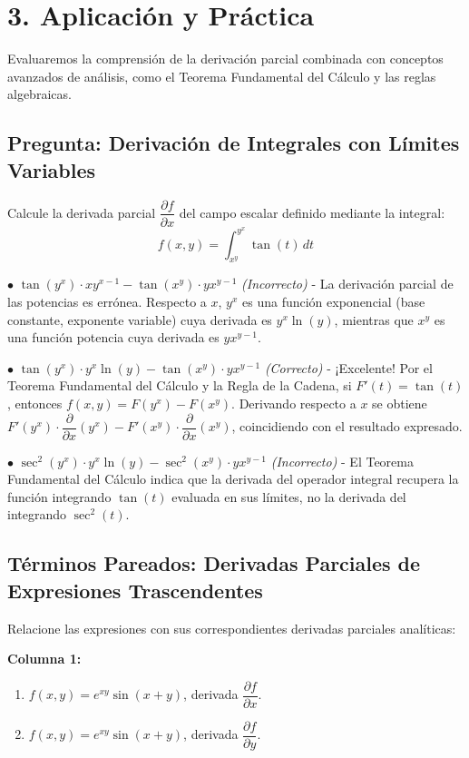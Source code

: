 \documentclass[11pt]{article}
\newenvironment{aplicacion}{%
  \section*{3. Aplicación y Práctica}%
}{}
\newenvironment{preguntaalternativas}[1]{\subsection*{Pregunta: #1}\par\vspace{0.1cm}}{\vspace{0.3cm}}
\newcommand{\opcion}[3]{\par\noindent $\bullet$ \textbf{#1} \textit{(#2)} - #3\par\vspace{0.15cm}}
\newenvironment{pareados}[1]{\subsection*{Términos Pareados: #1}}{\vspace{0.3cm}}
\newcommand{\columnaI}[1]{\textbf{Columna 1:}\begin{enumerate}#1\end{enumerate}}
\begin{document}
\begin{aplicacion}
  Evaluaremos la comprensión de la derivación parcial combinada con conceptos avanzados de análisis, como el Teorema Fundamental del Cálculo y las reglas algebraicas.

  \begin{preguntaalternativas}{Derivación de Integrales con Límites Variables}
    Calcule la derivada parcial $\displaystyle \dfrac{\partial f}{\partial x}$ del campo escalar definido mediante la integral:
    $$ f(x,y) = \int_{x^y}^{y^x} \tan(t) \, dt $$
    
    \opcion{$\tan(y^x) \cdot xy^{x-1} - \tan(x^y) \cdot yx^{y-1}$}{Incorrecto}{La derivación parcial de las potencias es errónea. Respecto a $x$, $y^x$ es una función exponencial (base constante, exponente variable) cuya derivada es $y^x \ln(y)$, mientras que $x^y$ es una función potencia cuya derivada es $y x^{y-1}$.}
    \opcion{$\tan(y^x) \cdot y^x \ln(y) - \tan(x^y) \cdot y x^{y-1}$}{Correcto}{¡Excelente! Por el Teorema Fundamental del Cálculo y la Regla de la Cadena, si $F'(t) = \tan(t)$, entonces $f(x,y) = F(y^x) - F(x^y)$. Derivando respecto a $x$ se obtiene $F'(y^x) \cdot \dfrac{\partial}{\partial x}(y^x) - F'(x^y) \cdot \dfrac{\partial}{\partial x}(x^y)$, coincidiendo con el resultado expresado.}
    \opcion{$\sec^2(y^x) \cdot y^x \ln(y) - \sec^2(x^y) \cdot y x^{y-1}$}{Incorrecto}{El Teorema Fundamental del Cálculo indica que la derivada del operador integral recupera la función integrando $\tan(t)$ evaluada en sus límites, no la derivada del integrando $\sec^2(t)$.}
  \end{preguntaalternativas}

  \begin{pareados}{Derivadas Parciales de Expresiones Trascendentes}
    Relacione las expresiones con sus correspondientes derivadas parciales analíticas:

    \columnaI{
      \item $f(x,y) = e^{xy} \sin(x+y)$, derivada $\displaystyle \dfrac{\partial f}{\partial x}$.
      \item $f(x,y) = e^{xy} \sin(x+y)$, derivada $\displaystyle \dfrac{\partial f}{\partial y}$.
    }


\end{pareados}
\end{aplicacion}
\end{document}
